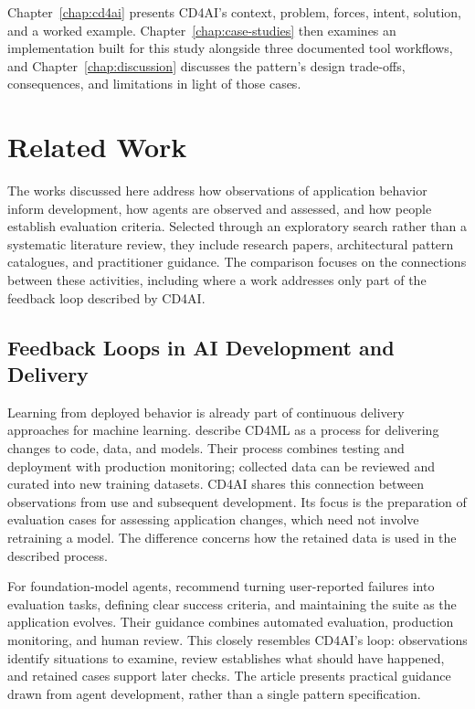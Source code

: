 Chapter~\ref{chap:cd4ai} presents CD4AI's context, problem, forces, intent,
solution, and a worked example. Chapter~\ref{chap:case-studies} then examines
an implementation built for this study alongside three documented tool
workflows, and Chapter~\ref{chap:discussion} discusses the pattern's design
trade-offs, consequences, and limitations in light of those cases.

\section{Related Work}
\label{sec:background-related-work}

The works discussed here address how observations of application behavior
inform development, how agents are observed and assessed, and how people
establish evaluation criteria. Selected through an exploratory search rather
than a systematic literature review, they include research papers,
architectural pattern catalogues, and practitioner guidance. The comparison
focuses on the connections between these activities, including where a work
addresses only part of the feedback loop described by CD4AI.

\subsection{Feedback Loops in AI Development and Delivery}
\label{sec:related-feedback}

Learning from deployed behavior is already part of continuous delivery
approaches for machine learning. \textcite{Sato:ContinuousDelivery4ML:2019}
describe CD4ML as a process for delivering changes to code, data, and models.
Their process combines testing and deployment with production monitoring;
collected data can be reviewed and curated into new training datasets.
CD4AI shares this connection between observations from use and subsequent
development. Its focus is the preparation of evaluation cases for assessing
application changes, which need not involve retraining a model. The difference
concerns how the retained data is used in the described process.

For foundation-model agents, \textcite{Grace:DemystifyingEvals:2026} recommend
turning user-reported failures into evaluation tasks, defining clear success
criteria, and maintaining the suite as the application evolves. Their guidance
combines automated evaluation, production monitoring, and human review. This
closely resembles CD4AI's loop: observations identify situations to examine,
review establishes what should have happened, and retained cases support later
checks. The article presents practical guidance drawn from agent development,
rather than a single pattern specification.

